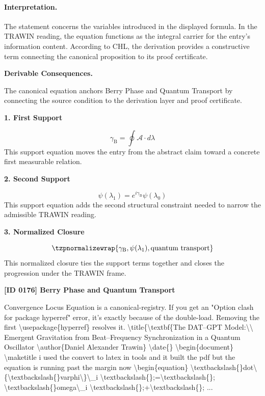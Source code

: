 \paragraph{Interpretation.}
The statement concerns the variables introduced in the displayed formula. In the TRAWIN reading, the equation functions as the integral carrier for the entry’s information content. According to CHL, the derivation provides a constructive term connecting the canonical proposition to its proof certificate.

\par\vspace{0.35em}
\noindent\textbf{Derivable Consequences.}\quad
\begingroup
\footnotesize
\raggedright
The canonical equation anchors Berry Phase and Quantum Transport by connecting the source condition to the derivation layer and proof certificate.
\par\endgroup

\noindent\textbf{1. First Support}\par
\[
\gamma_{\mathrm{B}} = \oint \mathcal{A}\cdot d\lambda
\]
\noindent This support equation moves the entry from the abstract claim toward a concrete first measurable relation.\par
\noindent\textbf{2. Second Support}\par
\[
\psi(\lambda_1)=e^{i\gamma_{\mathrm{B}}}\psi(\lambda_0)
\]
\noindent This support equation adds the second structural constraint needed to narrow the admissible TRAWIN reading.\par
\noindent\textbf{3. Normalized Closure}\par
\[
\tzpnormalizewrap{\gamma_{\mathrm{B}},\psi(\lambda_1),\text{quantum transport}}
\]
\noindent This normalized closure ties the support terms together and closes the progression under the TRAWIN frame.\par

\clearpage
\noindent\textbf{[ID 0176] Berry Phase and Quantum Transport}\par
\vspace{0.35em}
\begingroup\small
{}
Convergence Locus Equation is a canonical-registry. If you get an "Option clash for package hyperref" error, it's exactly because of the double-load. Removing the first \textbackslash{}usepackage\{hyperref\} resolves it. \textbackslash{}title\{\textbackslash{}textbf\{The DAT--GPT Model:\textbackslash{}\textbackslash{} Emergent Gravitation from Beat--Frequency Synchronization in a Quantum Oscillator \textbackslash{}author\{Daniel Alexander Trawin\} \textbackslash{}date\{\} \textbackslash{}begin\{document\} \textbackslash{}maketitle i used the convert to latex in tools and it built the pdf but the equation is running past the margin now \textbackslash{}begin\{equation\} \textbackslash{}textbackslash\{\}dot\textbackslash{}\{\textbackslash{}textbackslash\{\}varphi\textbackslash{}\}\textbackslash{}\_i \textbackslash{}textbackslash\{\};=\textbackslash{}textbackslash\{\}; \textbackslash{}textbackslash\{\}omega\textbackslash{}\_i \textbackslash{}textbackslash\{\};+\textbackslash{}textbackslash\{\}; ...

